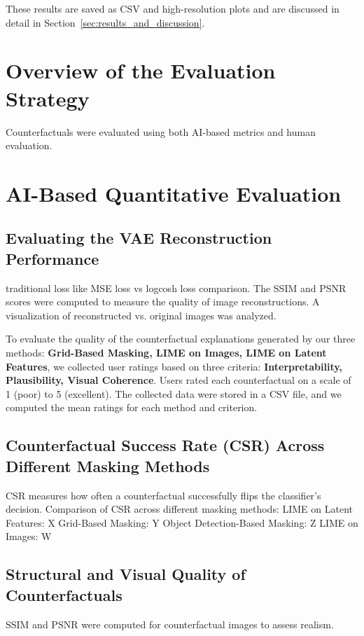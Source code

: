 These results are saved as CSV and high-resolution plots and are discussed in detail in Section~\ref{sec:results_and_discussion}.




\section{Overview of the Evaluation Strategy}
Counterfactuals were evaluated using both AI-based metrics and human evaluation.

\section{AI-Based Quantitative Evaluation}

\subsection{Evaluating the VAE Reconstruction Performance}
traditional loss like MSE loss vs logcosh loss comparison.
The SSIM and PSNR scores were computed to measure the quality of image reconstructions.
A visualization of reconstructed vs. original images was analyzed.

To evaluate the quality of the counterfactual explanations generated by our three methods: 
\textbf{Grid-Based Masking, LIME on Images, LIME on Latent Features}, we collected user ratings based on three criteria: 
\textbf{Interpretability, Plausibility, Visual Coherence}. Users rated each counterfactual on a scale of 1 (poor) to 5 (excellent). 
The collected data were stored in a CSV file, and we computed the mean ratings for each method and criterion.


\subsection{Counterfactual Success Rate (CSR) Across Different Masking Methods}
CSR measures how often a counterfactual successfully flips the classifier’s decision.
Comparison of CSR across different masking methods:
LIME on Latent Features: X%
Grid-Based Masking: Y%
Object Detection-Based Masking: Z%
LIME on Images: W%


\subsection{Structural and Visual Quality of Counterfactuals}
SSIM and PSNR were computed for counterfactual images to assess realism.






